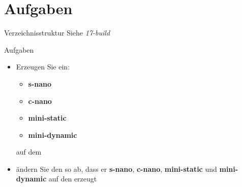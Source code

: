 \section{Aufgaben}

\begin{frame}{Verzeichnisstruktur}
 Siehe {\em 17-build}
\end{frame}


\begin{frame}{Aufgaben}
 \begin{itemize}
  \item Erzeugen Sie ein:
  \begin{itemize}
   \item {\bf s-nano}
   \item {\bf c-nano}
   \item {\bf mini-static}
   \item {\bf mini-dynamic}
  \end{itemize}
  auf dem \targetS\ 
  \item ändern Sie den  so ab, dass er {\bf s-nano}, {\bf c-nano}, 
  {\bf mini-static} und {\bf mini-dynamic} auf den \host erzeugt
 \end{itemize}
\end{frame}

